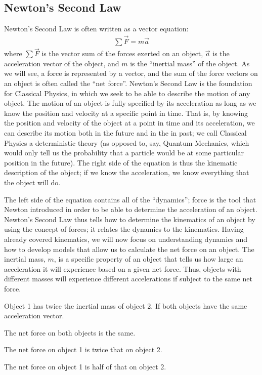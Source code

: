 \subsection{Newton's Second Law}
Newton's Second Law is often written as a vector equation:
\begin{align*}
\sum \vec F = m\vec a
\end{align*}
where $\sum \vec F$ is the vector sum of the forces exerted on an object, $\vec a$ is the acceleration vector of the object, and $m$ is the ``inertial mass'' of the object. As we will see, a force is represented by a vector, and the sum of the force vectors on an object is often called the ``net force''. Newton's Second Law is the foundation for Classical Physics, in which we seek to be able to describe the motion of any object. The motion of an object is fully specified by its acceleration as long as we know the position and velocity at a specific point in time. That is, by knowing the position and velocity of the object at a point in time and its acceleration, we can describe its motion both in the future and in the in past; we call Classical Physics a deterministic theory (as opposed to, say, Quantum Mechanics, which would only tell us the probability that a particle would be at some particular position in the future). The right side of the equation is thus the kinematic description of the object; if we know the acceleration, we know everything that the object will do.

The left side of the equation contains all of the ``dynamics''; force is the tool that Newton introduced in order to be able to determine the acceleration of an object. Newton's Second Law thus tells how to determine the kinematics of an object by using the concept of forces; it relates the dynamics to the kinematics. Having already covered kinematics, we will now focus on understanding dynamics and how to develop models that allow us to calculate the net force on an object. The inertial mass, $m$, is a specific property of an object that tells us how large an acceleration it will experience based on a given net force. Thus, objects with different masses will experience different accelerations if subject to the same net force.

\begin{checkpointMC}{Object 1 has twice the inertial mass of object 2. If both objects have the same acceleration vector.}
\item The net force on both objects is the same.
\item The net force on object 1 is twice that on object 2. %
\item The net force on object 1 is half of that on object 2.
\end{checkpointMC}


